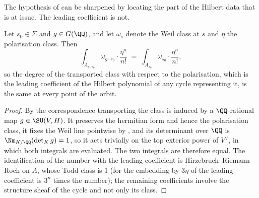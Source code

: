 The hypothesis of  can be sharpened by locating the
part of the Hilbert data that is at issue. The leading coefficient is not.

\begin{proposition}
\label{prop:leadingconstant}
Let $s_{0}\in\Sigma$ and $g\in G(\QQ)$, and let $\omega_{s}$ denote the Weil
class at $s$ and $\eta$ the polarisation class. Then
\[
  \int_{A_{g\cdot s_{0}}}\omega_{g\cdot s_{0}}\cdot\frac{\eta^{n}}{n!}
  \;=\;\int_{A_{s_{0}}}\omega_{s_{0}}\cdot\frac{\eta^{n}}{n!},
\]
so the degree of the transported class with respect to the polarisation, which
is the leading coefficient of the Hilbert polynomial of any cycle
representing it, is the same at every point of the orbit.
\end{proposition}

\begin{proof}
By  the correspondence transporting the class is induced
by a $\QQ$-rational map $g\in\SU(V,H)$. It preserves the hermitian form and
hence the polarisation class, it fixes the Weil line pointwise by
, and its determinant over $\QQ$ is
$\Nm_{K/\QQ}(\det_{K}g)=1$, so it acts trivially on the top exterior power of
$V^{\vee}$, in which both integrals are evaluated. The two integrals are
therefore equal. The identification of the number with the leading
coefficient is Hirzebruch--Riemann--Roch on $A$, whose Todd class is $1$ (for
the embedding by $3\eta$ of  the leading coefficient is
$3^{n}$ times the number); the remaining coefficients involve the structure
sheaf of the cycle and not only its class.
\end{proof}


